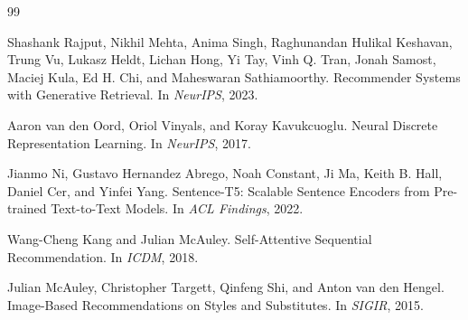 \documentclass[sigconf]{acmart}
\begin{document}

\sloppy
\begin{thebibliography}{99}

Shashank Rajput, Nikhil Mehta, Anima Singh, Raghunandan Hulikal Keshavan,
Trung Vu, Lukasz Heldt, Lichan Hong, Yi Tay, Vinh Q. Tran, Jonah Samost,
Maciej Kula, Ed H. Chi, and Maheswaran Sathiamoorthy.  Recommender Systems
with Generative Retrieval.  In \emph{NeurIPS}, 2023.

Aaron van den Oord, Oriol Vinyals, and Koray Kavukcuoglu.  Neural Discrete
Representation Learning.  In \emph{NeurIPS}, 2017.

Jianmo Ni, Gustavo Hernandez Abrego, Noah Constant, Ji Ma, Keith B. Hall,
Daniel Cer, and Yinfei Yang.  Sentence-T5: Scalable Sentence Encoders
from Pre-trained Text-to-Text Models.  In \emph{ACL Findings}, 2022.

Wang-Cheng Kang and Julian McAuley.  Self-Attentive Sequential
Recommendation.  In \emph{ICDM}, 2018.

Julian McAuley, Christopher Targett, Qinfeng Shi, and Anton van den Hengel.
Image-Based Recommendations on Styles and Substitutes.  In \emph{SIGIR},
2015.

\end{thebibliography}
\end{document}
